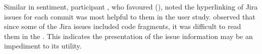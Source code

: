 Similar in sentiment, participant , who favoured (), noted the hyperlinking of Jira issues for each commit
was most helpful to them in the user study.
 observed that since some of the Jira issues included code fragments, it was difficult to read them in the .
This indicates the presentation of the issue information may be an impediment to its utility.

\endinput

Any text after an \endinput is ignored.
You could put scraps here or things in progress.